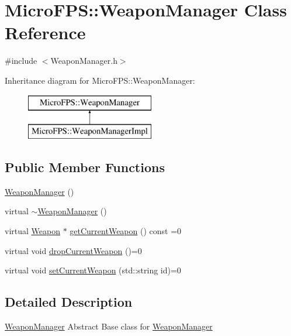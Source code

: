 \hypertarget{class_micro_f_p_s_1_1_weapon_manager}{
\section{MicroFPS::WeaponManager Class Reference}
\label{d2/d47/class_micro_f_p_s_1_1_weapon_manager}
}


{\ttfamily \#include $<$WeaponManager.h$>$}

Inheritance diagram for MicroFPS::WeaponManager:\begin{figure}[H]
\begin{center}
\leavevmode
\includegraphics[height=2.000000cm]{d2/d47/class_micro_f_p_s_1_1_weapon_manager}
\end{center}
\end{figure}
\subsection*{Public Member Functions}
\begin{DoxyCompactItemize}
\item 
\hyperlink{class_micro_f_p_s_1_1_weapon_manager_a1e72b3730d1bda32c1986f16a7e49bd6}{WeaponManager} ()
\item 
virtual \hyperlink{class_micro_f_p_s_1_1_weapon_manager_a9cc12cb51ef647b54a4b6f51a93171cd}{$\sim$WeaponManager} ()
\item 
virtual \hyperlink{class_micro_f_p_s_1_1_weapon}{Weapon} $\ast$ \hyperlink{class_micro_f_p_s_1_1_weapon_manager_ad868c1e3e98106d509e1478d62df732f}{getCurrentWeapon} () const =0
\item 
virtual void \hyperlink{class_micro_f_p_s_1_1_weapon_manager_aa92823b02b2b20e7b6a3ed547296b013}{dropCurrentWeapon} ()=0
\item 
virtual void \hyperlink{class_micro_f_p_s_1_1_weapon_manager_a7381fdae24f720794410c7ba777fc1d2}{setCurrentWeapon} (std::string id)=0
\end{DoxyCompactItemize}


\subsection{Detailed Description}
\hyperlink{class_micro_f_p_s_1_1_weapon_manager}{WeaponManager} Abstract Base class for \hyperlink{class_micro_f_p_s_1_1_weapon_manager}{WeaponManager} 

